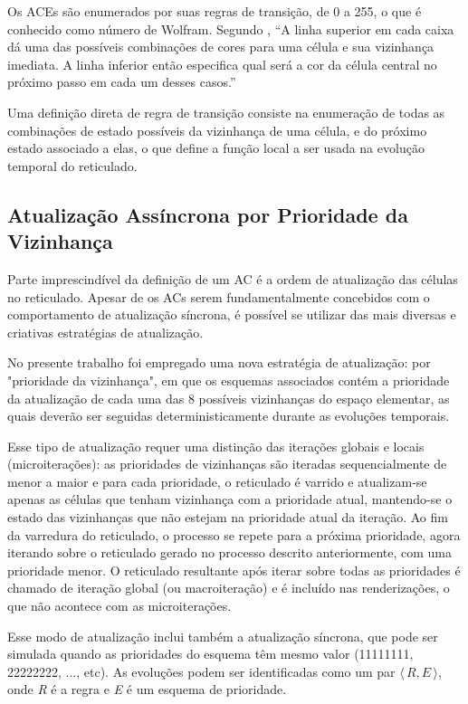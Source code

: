 \documentclass[a4paper,12pt]{ltxdoc}
\newcommand\tab[1][1cm]{\hspace*{#1}}
\begin{document}
\tab Os ACEs são enumerados por suas regras de transição, de 0 a 255, o que é conhecido como número de Wolfram. Segundo \cite[p. 24]{wolfram2002new}, ``A linha superior em cada caixa dá uma das possíveis combinações de cores para uma célula e sua vizinhança imediata. A linha inferior então especifica qual será a cor da célula central no próximo passo em cada um desses casos.''

\tab Uma definição direta de regra de transição consiste na enumeração de todas as combinações de estado possíveis da vizinhança de uma célula, e do próximo estado associado a elas, o que define a função local a ser usada na evolução temporal do reticulado.


\subsection{Atualização Assíncrona por Prioridade da Vizinhança} \label{udsn}
Parte imprescindível da definição de um AC é a ordem de atualização das células no reticulado. Apesar de os ACs serem fundamentalmente concebidos com o comportamento de atualização síncrona, é possível se utilizar das mais diversas e criativas estratégias de atualização.

\tab No presente trabalho foi empregado uma nova estratégia de atualização: por "prioridade da vizinhança", em que os esquemas associados contém a prioridade da atualização de cada uma das 8 possíveis vizinhanças do espaço elementar, as quais deverão ser seguidas deterministicamente durante as evoluções temporais.  

\tab Esse tipo de atualização requer uma distinção das iterações globais e locais (microiterações):  as prioridades de vizinhanças são iteradas sequencialmente de menor a maior e para cada prioridade, o reticulado é varrido e atualizam-se apenas as células que tenham vizinhança com a prioridade atual, mantendo-se o estado das vizinhanças que não estejam na prioridade atual da iteração. Ao fim da varredura do reticulado, o processo se repete para a próxima prioridade, agora iterando sobre o reticulado gerado no processo descrito anteriormente, com uma prioridade menor. O reticulado resultante após iterar sobre todas as prioridades é chamado de iteração global (ou macroiteração) e é incluído nas renderizações, o que não acontece com as microiterações.

\tab Esse modo de atualização inclui também a atualização síncrona, que pode ser simulada quando as prioridades do esquema têm mesmo valor (11111111, 22222222, ..., etc). As evoluções podem ser identificadas como um par $\langle\,R,E\,\rangle$, onde \textit{R} é a regra e \textit{E} é um esquema de prioridade. 
\end{document}
